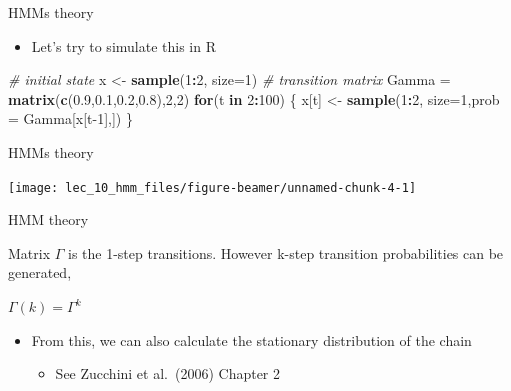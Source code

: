\documentclass[
  ignorenonframetext,
]{beamer}
\newenvironment{Shaded}{\begin{snugshade}}{\end{snugshade}}
\newcommand{\CommentTok}[1]{\textcolor[rgb]{0.56,0.35,0.01}{\textit{#1}}}
\newcommand{\ControlFlowTok}[1]{\textcolor[rgb]{0.13,0.29,0.53}{\textbf{#1}}}
\newcommand{\DataTypeTok}[1]{\textcolor[rgb]{0.13,0.29,0.53}{#1}}
\newcommand{\DecValTok}[1]{\textcolor[rgb]{0.00,0.00,0.81}{#1}}
\newcommand{\FloatTok}[1]{\textcolor[rgb]{0.00,0.00,0.81}{#1}}
\newcommand{\KeywordTok}[1]{\textcolor[rgb]{0.13,0.29,0.53}{\textbf{#1}}}
\newcommand{\NormalTok}[1]{#1}
\newcommand{\OperatorTok}[1]{\textcolor[rgb]{0.81,0.36,0.00}{\textbf{#1}}}
\newcommand{\StringTok}[1]{\textcolor[rgb]{0.31,0.60,0.02}{#1}}
\providecommand{\tightlist}{%
  \setlength{\itemsep}{0pt}\setlength{\parskip}{0pt}}
\begin{document}
\begin{frame}[fragile]{HMMs theory}
\protect\hypertarget{hmms-theory}{}

\begin{itemize}
\tightlist
\item
  Let's try to simulate this in R
\end{itemize}

\begin{Shaded}
\begin{Highlighting}[]
\CommentTok{# initial state}
\NormalTok{x <-}\StringTok{ }\KeywordTok{sample}\NormalTok{(}\DecValTok{1}\OperatorTok{:}\DecValTok{2}\NormalTok{, }\DataTypeTok{size=}\DecValTok{1}\NormalTok{)}
\CommentTok{# transition matrix}
\NormalTok{Gamma =}\StringTok{ }\KeywordTok{matrix}\NormalTok{(}\KeywordTok{c}\NormalTok{(}\FloatTok{0.9}\NormalTok{,}\FloatTok{0.1}\NormalTok{,}\FloatTok{0.2}\NormalTok{,}\FloatTok{0.8}\NormalTok{),}\DecValTok{2}\NormalTok{,}\DecValTok{2}\NormalTok{)}
\ControlFlowTok{for}\NormalTok{(t }\ControlFlowTok{in} \DecValTok{2}\OperatorTok{:}\DecValTok{100}\NormalTok{) \{}
\NormalTok{  x[t] <-}\StringTok{ }\KeywordTok{sample}\NormalTok{(}\DecValTok{1}\OperatorTok{:}\DecValTok{2}\NormalTok{, }\DataTypeTok{size=}\DecValTok{1}\NormalTok{,}\DataTypeTok{prob =}\NormalTok{ Gamma[x[t}\DecValTok{-1}\NormalTok{],])}
\NormalTok{\}}
\end{Highlighting}
\end{Shaded}

\end{frame}

\begin{frame}{HMMs theory}
\protect\hypertarget{hmms-theory-1}{}

\begin{center}\texttt{[image: lec\_10\_hmm\_files/figure-beamer/unnamed-chunk-4-1]} \end{center}

\end{frame}

\begin{frame}{HMM theory}
\protect\hypertarget{hmm-theory-2}{}

Matrix \(\Gamma\) is the 1-step transitions. However k-step transition
probabilities can be generated,

\(\Gamma(k) = \Gamma^{k}\)

\begin{itemize}
\tightlist
\item
  From this, we can also calculate the stationary distribution of the
  chain

  \begin{itemize}
  \tightlist
  \item
    See Zucchini et al.~(2006) Chapter 2
  \end{itemize}
\end{itemize}

\end{frame}
\end{document}
